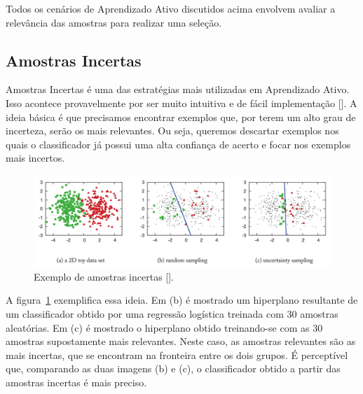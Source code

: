 Todos os cenários de Aprendizado Ativo discutidos acima envolvem avaliar a relevância das amostras para realizar uma seleção. 




\subsection{Amostras Incertas} %
\label{sec:amostras_incertas}

Amostras Incertas é uma das estratégias mais utilizadas em Aprendizado Ativo. Isso acontece provavelmente por ser muito intuitiva e de fácil implementação [\cite{settles2014active}]. A ideia básica é que precisamos encontrar exemplos que, por terem um alto grau de incerteza, serão os mais relevantes. Ou seja, queremos descartar exemplos nos quais o classificador já possui uma alta confiança de acerto e focar nos exemplos mais incertos.  


\begin{figure}
  \centering
  \includegraphics[width=1.0\textwidth]{figures/settles_2014_uncertainty_sampling_example.png}
  \caption{Exemplo de amostras incertas [\cite{settles2014active}].}
  \label{fig:settles_2014_uncertainty_example}
\end{figure}

A figura~\ref{fig:settles_2014_uncertainty_example} exemplifica essa ideia. Em (b) é mostrado um hiperplano resultante de um classificador obtido por uma regressão logística treinada com 30 amostras aleatórias. Em (c) é mostrado o hiperplano obtido treinando-se com as 30 amostras supostamente mais relevantes. Neste caso, as amostras relevantes são as mais incertas, que se encontram na fronteira entre os dois grupos. É perceptível que, comparando as duas imagens (b) e (c), o classificador obtido a partir das amostras incertas é mais preciso.%

